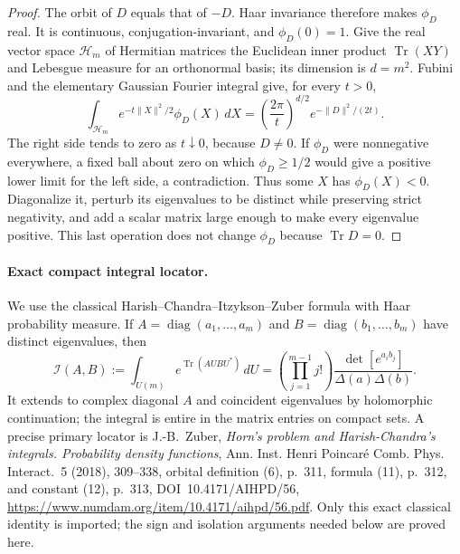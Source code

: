 \begin{proof}
The orbit of $D$ equals that of $-D$. Haar invariance therefore makes
$\phi_D$ real. It is continuous, conjugation-invariant, and
$\phi_D(0)=1$. Give the real vector space $\mathcal H_m$ of Hermitian
matrices the Euclidean inner product $\operatorname{Tr}(XY)$ and
Lebesgue measure for an orthonormal basis; its dimension is $d=m^2$.
Fubini and the elementary Gaussian Fourier integral give, for every
$t>0$,
\begin{equation}\label{eq:analytic-orbital-Gaussian}
 \int_{\mathcal H_m}e^{-t\|X\|^2/2}\phi_D(X)\,dX
       =\left(\frac{2\pi}{t}\right)^{d/2}
                         e^{-\|D\|^2/(2t)}.
\end{equation}
The right side tends to zero as $t\downarrow0$, because $D\ne0$.
If $\phi_D$ were nonnegative everywhere, a fixed ball about zero on
which $\phi_D\ge1/2$ would give a positive lower limit for the left
side, a contradiction. Thus some $X$ has $\phi_D(X)<0$.
Diagonalize it, perturb its eigenvalues to be distinct while preserving
strict negativity, and add a scalar matrix large enough to make every
eigenvalue positive. This last operation does not change $\phi_D$
because $\operatorname{Tr}D=0$.
\end{proof}

\paragraph{Exact compact integral locator.}
We use the classical Harish--Chandra--Itzykson--Zuber formula with Haar
probability measure. If $A=\operatorname{diag}(a_1,\ldots,a_m)$ and
$B=\operatorname{diag}(b_1,\ldots,b_m)$ have distinct eigenvalues, then
\begin{equation}\label{eq:analytic-HCIZ}
 \mathcal I(A,B):=\int_{U(m)}e^{\operatorname{Tr}(AUBU^*)}\,dU
       =\left(\prod_{j=1}^{m-1}j!\right)
                    \frac{\det[e^{a_i b_j}]}{\Delta(a)\Delta(b)}.
\end{equation}
It extends to complex diagonal $A$ and coincident eigenvalues by
holomorphic continuation; the integral is entire in the matrix entries
on compact sets. A precise primary locator is J.-B.~Zuber,
\emph{Horn's problem and Harish-Chandra's integrals. Probability
density functions}, Ann. Inst. Henri Poincar\'e Comb. Phys. Interact.~5
(2018), 309--338, orbital definition (6), p.~311, formula (11), p.~312,
and constant (12), p.~313, DOI~10.4171/AIHPD/56,
\url{https://www.numdam.org/item/10.4171/aihpd/56.pdf}.
Only this exact classical identity is imported; the sign and isolation
arguments needed below are proved here.

